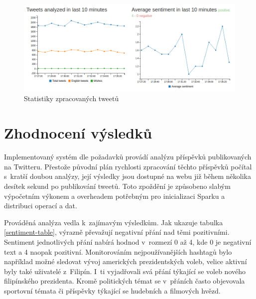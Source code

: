 \documentclass[thesis=B,czech]{FITthesis}[2012/06/26]
\begin{document}
	\begin{figure}[ht]
    	\centering
    	\includegraphics[width=1\textwidth]{images/web-stats.png}
    	\caption{Statistiky zpracovaných tweetů}
    	\label{fig:web-stats}
	\end{figure}

\chapter{Zhodnocení výsledků}
\label{zhodnoceni}
Implementovaný systém dle požadavků provádí analýzu příspěvků publikovaných na Twitteru. Přestože původní plán rychlosti zpracování těchto příspěvků počítal s~kratší doubou analýzy, její výsledky jsou dostupné na webu již během několika desítek sekund po publikování tweetů. Toto zpoždění je způsobeno slabým výpočetním výkonem a overheadem potřebným pro inicializaci Sparku a distribuci operací a dat. 

Prováděná analýza vedla k~zajímavým výsledkům. Jak ukazuje tabulka \ref{sentiment-table}, výrazně převažují negativní přání nad těmi pozitivními. Sentiment jednotlivých přání nabírá hodnod v~rozmezí 0 až 4, kde 0 je negativní text a 4 naopak pozitivní. Monitorováním nejpoužívanějších hashtagů bylo například možné sledovat vývoj amerických prezidentských voleb, velice aktivní byly také uživatelé z~Filipín. I~ti vyjadřovali svá přání týkající se voleb nového filipínského prezidenta. Kromě politických témat se v~přáních často objevovala sportovní témata či příspěvky týkající se hudebních a filmových hvězd. 
\end{document}
